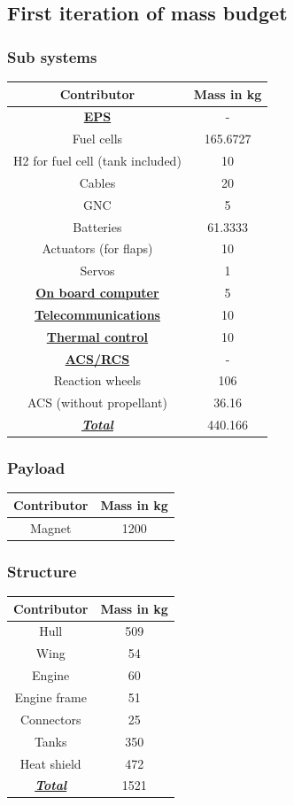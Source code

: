 \hypertarget{header-n90}{%
	\subsection{First iteration of mass budget}\label{header-n90}}

\hypertarget{header-n91}{%
	\subsubsection{Sub systems}\label{header-n91}}

\begin{longtable}[]{@{}cc@{}}
	\toprule
	Contributor & Mass in kg\tabularnewline
	\midrule
	\endhead
	\underline{\textbf{EPS}} & -\tabularnewline
	Fuel cells & 165.6727\tabularnewline
	H2 for fuel cell (tank included) & 10\tabularnewline
	Cables & 20\tabularnewline
	GNC & 5\tabularnewline
	Batteries & 61.3333\tabularnewline
	Actuators (for flaps) & 10\tabularnewline
	Servos & 1\tabularnewline
	\underline{\textbf{On board computer}} & 5\tabularnewline
	\underline{\textbf{Telecommunications}} & 10\tabularnewline
	\underline{\textbf{Thermal control}} & 10\tabularnewline
	\underline{\textbf{ACS/RCS}} & -\tabularnewline
	Reaction wheels & 106\tabularnewline
	ACS (without propellant) & 36.16\tabularnewline
	\underline{\textbf{\emph{Total}}} & 440.166\tabularnewline
	\bottomrule
\end{longtable}

\hypertarget{header-n120}{%
	\subsubsection{Payload}\label{header-n120}}

\begin{longtable}[]{@{}cc@{}}
	\toprule
	Contributor & Mass in kg\tabularnewline
	\midrule
	\endhead
	Magnet & 1200\tabularnewline
	\bottomrule
\end{longtable}

\hypertarget{header-n147}{%
	\subsubsection{Structure}\label{header-n147}}

\begin{longtable}[]{@{}cc@{}}
	\toprule
	Contributor & Mass in kg\tabularnewline
	\midrule
	\endhead
	Hull & 509\tabularnewline
	Wing & 54\tabularnewline
	Engine & 60\tabularnewline
	Engine frame & 51\tabularnewline
	Connectors & 25\tabularnewline
	Tanks & 350\tabularnewline
	Heat shield & 472\tabularnewline
	\underline{\textbf{\emph{Total}}} & 1521\tabularnewline
	\bottomrule
\end{longtable}

